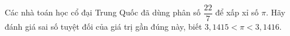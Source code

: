 \begin{ex}
Các nhà toán học cổ đại Trung Quốc đã dùng phân số $\dfrac{22}{7}$ để xấp xỉ số $\pi$. Hãy đánh giá sai số tuyệt đối của giá trị gần đúng này, biết $3{,}1415<\pi<3{,}1416$.
\end{ex}
